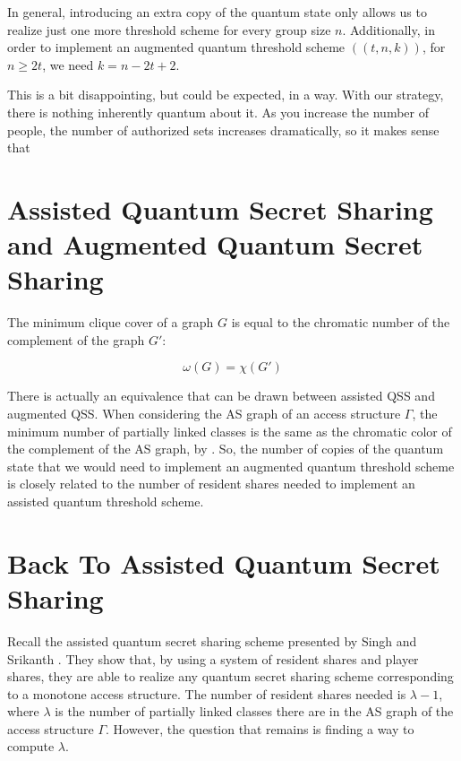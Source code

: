 In general, introducing an extra copy of the quantum state only allows us to realize just one more threshold scheme for every group size $n$. Additionally, in order to implement an augmented quantum threshold scheme $((t,n,k))$, for $n \geq 2t$, we need $k = n - 2t + 2$.

This is a bit disappointing, but could be expected, in a way. With our strategy, there is nothing inherently quantum about it. As you increase the number of people, the number of authorized sets increases dramatically, so it makes sense that 

\section{Assisted Quantum Secret Sharing and Augmented Quantum Secret Sharing}

\begin{theorem}
    \label{thm:chrom-clique}
    The minimum clique cover of a graph $G$ is equal to the chromatic number of the complement of the graph $G'$:
    
    \[\omega(G) = \chi(G')\]
\end{theorem}

There is actually an equivalence that can be drawn between assisted QSS and augmented QSS. When considering the AS graph of an access structure $\Gamma$, the minimum number of partially linked classes is the same as the chromatic color of the complement of the AS graph, by . So, the number of copies of the quantum state that we would need to implement an augmented quantum threshold scheme is closely related to the number of resident shares needed to implement an assisted quantum threshold scheme.

\section{Back To Assisted Quantum Secret Sharing}

Recall the assisted quantum secret sharing scheme presented by Singh and Srikanth \cite{singh_assisted_2004}. They show that, by using a system of resident shares and player shares, they are able to realize any quantum secret sharing scheme corresponding to a monotone access structure. The number of resident shares needed is $\lambda-1$, where $\lambda$ is the number of partially linked classes there are in the AS graph of the access structure $\Gamma$. However, the question that remains is finding a way to compute $\lambda$.

